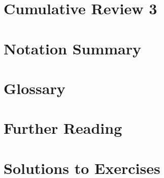 \documentclass[11pt]{report}
\begin{document}
\chapter*{Cumulative Review 3}


\appendix
\chapter{Notation Summary}


\chapter{Glossary}


\chapter{Further Reading}


\chapter{Solutions to Exercises}


\printindex
\end{document}
